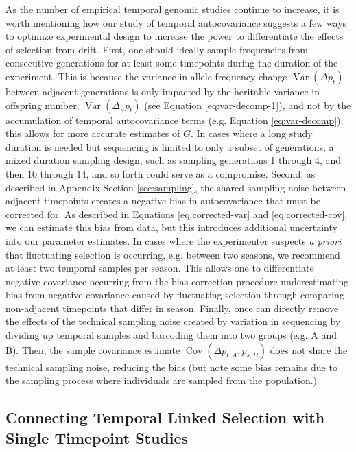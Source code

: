 \documentclass[11pt]{article}
\DeclareMathOperator{\var}{Var}
\DeclareMathOperator{\cov}{Cov}
\begin{document}
As the number of empirical temporal genomic studies continue to increase, it is
worth mentioning how our study of temporal autocovariance suggests a few ways
to optimize experimental design to increase the power to differentiate the
effects of selection from drift. First, one should ideally sample frequencies
from consecutive generations for at least some timepoints during the duration
of the experiment. This is because the variance in allele frequency change
$\var(\Delta p_t)$ between adjacent generations is only impacted by the
heritable variance in offspring number, $\var(\Delta_{_H} p_t)$ (see Equation
\ref{eq:var-decomp-1}), and not by the accumulation of temporal autocovariance
terms (e.g. Equation \ref{eq:var-decomp}); this allows for more accurate
estimates of $G$. In cases where a long study duration is needed but sequencing
is limited to only a subset of generations, a mixed duration sampling design,
such as sampling generations 1 through 4, and then 10 through 14, and so forth
could serve as a compromise. Second, as described in Appendix Section
\ref{sec:sampling}, the shared sampling noise between adjacent timepoints
creates a negative bias in autocovariance that must be corrected for. As
described in Equations \eqref{eq:corrected-var} and \eqref{eq:corrected-cov},
we can estimate this bias from data, but this introduces additional uncertainty
into our parameter estimates. In cases where the experimenter suspects \emph{a
priori} that fluctuating selection is occurring, e.g. between two seasons, we
recommend at least two temporal samples per season. This allows one to
differentiate negative covariance occurring from the bias correction procedure
underestimating bias from negative covariance caused by fluctuating selection
through comparing non-adjacent timepoints that differ in season. Finally, once
can directly remove the effects of the technical sampling noise created by
variation in sequencing by dividing up temporal samples and barcoding them into
two groups (e.g. A and B). Then, the sample covariance estimate $\cov(\Delta
p_{t,A}, p_{s,B})$ does not share the technical sampling noise, reducing the
bias (but note some bias remains due to the sampling process where individuals
are sampled from the population.)

\subsection{Connecting Temporal Linked Selection with Single Timepoint Studies}
\end{document}

